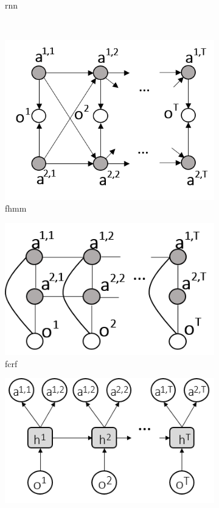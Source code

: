 \begin{figure}[ht]
\begin{subfigure}{0.32\textwidth}
    \caption{rnn}
    \label{rnn}
  \end{subfigure}
  \\
  \begin{subfigure}{0.32\textwidth}
    \includegraphics[width=1\textwidth]{fhmm_interact.png}
    \caption{fhmm}
    \label{fhmm}
  \end{subfigure}
  \begin{subfigure}{0.32\textwidth}
    \includegraphics[width=1\textwidth]{fcrf.png}
    \caption{fcrf}
    \label{fcrf}
\end{subfigure}
  \begin{subfigure}{0.32\textwidth}
    \includegraphics[width=1\textwidth]{rnn_mt1.png}

\end{subfigure}
\end{figure}
